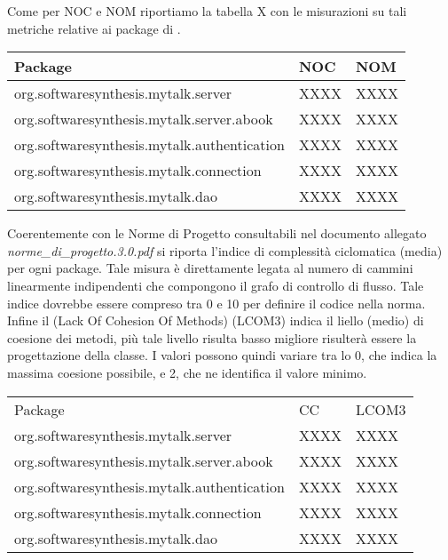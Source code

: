 Come per NOC e NOM riportiamo la tabella X con le misurazioni su tali metriche relative ai package di \caName{}.


\begin{center}
\begin{longtable}{p{}ll}
\toprule Package & NOC  & NOM\\
\midrule
org.softwaresynthesis.mytalk.server & XXXX & XXXX\\
org.softwaresynthesis.mytalk.server.abook & XXXX & XXXX\\
org.softwaresynthesis.mytalk.authentication & XXXX & XXXX\\
org.softwaresynthesis.mytalk.connection & XXXX & XXXX\\
org.softwaresynthesis.mytalk.dao & XXXX & XXXX\\
\bottomrule
\end{longtable}
\end{center}


Coerentemente con le Norme di Progetto consultabili nel documento allegato \textit{norme\_di\_progetto.3.0.pdf} si riporta l'indice di complessità ciclomatica (media) per ogni package. Tale misura è direttamente legata al numero di cammini linearmente indipendenti che compongono il grafo di controllo di flusso. Tale indice dovrebbe essere compreso tra 0 e 10 per definire il codice nella norma.
Infine il \inglese(Lack Of Cohesion Of Methods) (LCOM3) indica il liello (medio) di coesione dei metodi, più tale livello risulta basso migliore risulterà essere la progettazione della classe. I valori possono quindi variare tra lo 0, che indica la massima coesione possibile, e 2, che ne identifica il valore minimo.


\begin{center}
\begin{longtable}{p{}ll}
\toprule Package & CC  & LCOM3\\
org.softwaresynthesis.mytalk.server & XXXX & XXXX\\
org.softwaresynthesis.mytalk.server.abook & XXXX & XXXX\\
org.softwaresynthesis.mytalk.authentication & XXXX & XXXX\\
org.softwaresynthesis.mytalk.connection & XXXX & XXXX\\
org.softwaresynthesis.mytalk.dao & XXXX & XXXX\\
\midrule

\bottomrule
\end{longtable}
\end{center}



